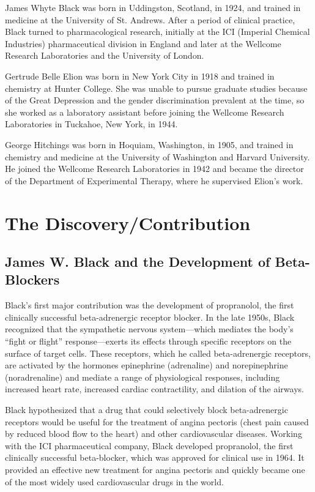 James Whyte Black was born in Uddingston, Scotland, in 1924, and trained in medicine at the University of St. Andrews. After a period of clinical practice, Black turned to pharmacological research, initially at the ICI (Imperial Chemical Industries) pharmaceutical division in England and later at the Wellcome Research Laboratories and the University of London.

Gertrude Belle Elion was born in New York City in 1918 and trained in chemistry at Hunter College. She was unable to pursue graduate studies because of the Great Depression and the gender discrimination prevalent at the time, so she worked as a laboratory assistant before joining the Wellcome Research Laboratories in Tuckahoe, New York, in 1944.

George Hitchings was born in Hoquiam, Washington, in 1905, and trained in chemistry and medicine at the University of Washington and Harvard University. He joined the Wellcome Research Laboratories in 1942 and became the director of the Department of Experimental Therapy, where he supervised Elion's work.

\section{The Discovery/Contribution}

\subsection{James W. Black and the Development of Beta-Blockers}

Black's first major contribution was the development of propranolol, the first clinically successful beta-adrenergic receptor blocker. In the late 1950s, Black recognized that the sympathetic nervous system---which mediates the body's ``fight or flight'' response---exerts its effects through specific receptors on the surface of target cells. These receptors, which he called beta-adrenergic receptors, are activated by the hormones epinephrine (adrenaline) and norepinephrine (noradrenaline) and mediate a range of physiological responses, including increased heart rate, increased cardiac contractility, and dilation of the airways.

Black hypothesized that a drug that could selectively block beta-adrenergic receptors would be useful for the treatment of angina pectoris (chest pain caused by reduced blood flow to the heart) and other cardiovascular diseases. Working with the ICI pharmaceutical company, Black developed propranolol, the first clinically successful beta-blocker, which was approved for clinical use in 1964. It provided an effective new treatment for angina pectoris and quickly became one of the most widely used cardiovascular drugs in the world.

